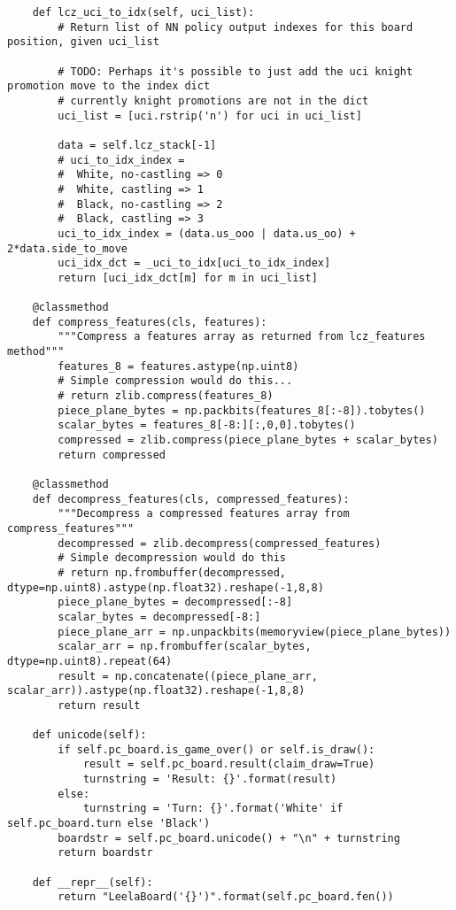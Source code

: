 \begin{verbatim}
    def lcz_uci_to_idx(self, uci_list):
        # Return list of NN policy output indexes for this board position, given uci_list
        
        # TODO: Perhaps it's possible to just add the uci knight promotion move to the index dict
        # currently knight promotions are not in the dict 
        uci_list = [uci.rstrip('n') for uci in uci_list]
        
        data = self.lcz_stack[-1]
        # uci_to_idx_index =
        #  White, no-castling => 0
        #  White, castling => 1
        #  Black, no-castling => 2
        #  Black, castling => 3
        uci_to_idx_index = (data.us_ooo | data.us_oo) +  2*data.side_to_move
        uci_idx_dct = _uci_to_idx[uci_to_idx_index]
        return [uci_idx_dct[m] for m in uci_list]
    
    @classmethod
    def compress_features(cls, features):
        """Compress a features array as returned from lcz_features method"""
        features_8 = features.astype(np.uint8)
        # Simple compression would do this...
        # return zlib.compress(features_8)
        piece_plane_bytes = np.packbits(features_8[:-8]).tobytes()
        scalar_bytes = features_8[-8:][:,0,0].tobytes()
        compressed = zlib.compress(piece_plane_bytes + scalar_bytes)
        return compressed
    
    @classmethod
    def decompress_features(cls, compressed_features):
        """Decompress a compressed features array from compress_features"""
        decompressed = zlib.decompress(compressed_features)
        # Simple decompression would do this
        # return np.frombuffer(decompressed, dtype=np.uint8).astype(np.float32).reshape(-1,8,8)
        piece_plane_bytes = decompressed[:-8]
        scalar_bytes = decompressed[-8:]
        piece_plane_arr = np.unpackbits(memoryview(piece_plane_bytes))
        scalar_arr = np.frombuffer(scalar_bytes, dtype=np.uint8).repeat(64)
        result = np.concatenate((piece_plane_arr, scalar_arr)).astype(np.float32).reshape(-1,8,8)
        return result
    
    def unicode(self):
        if self.pc_board.is_game_over() or self.is_draw():
            result = self.pc_board.result(claim_draw=True)
            turnstring = 'Result: {}'.format(result)
        else:
            turnstring = 'Turn: {}'.format('White' if self.pc_board.turn else 'Black') 
        boardstr = self.pc_board.unicode() + "\n" + turnstring
        return boardstr

    def __repr__(self):
        return "LeelaBoard('{}')".format(self.pc_board.fen())


\end{verbatim}
